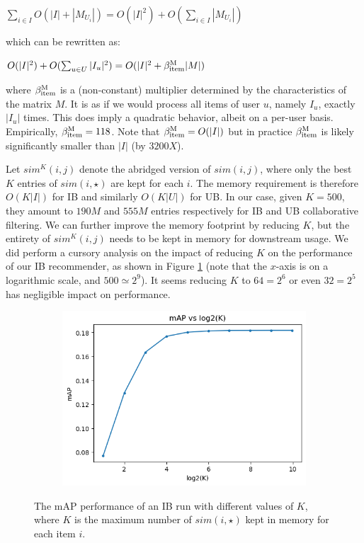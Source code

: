 \documentclass[conference]{IEEEtran}
\newcommand{\mAP}{m\textsc{AP} }
\begin{document}
\hspace{1em}$\sum_{i\in I} O(|I| + |M_{U_i}|) = O(|I|^2) + O(\sum_{i\in I}|M_{U_i}|)$

which can be rewritten as:

\hspace{1em}$O(|I|^2) + O(\sum_{u\in U}|I_u|^2) = O(|I|^2 + \beta_{\rm item}^{\rm M} |M|)$

where $\beta_{\rm item}^{\rm M}$ is a (non-constant) multiplier determined by the characteristics of
the matrix $M$. It is as if
we would process all items of user $u$, namely $I_u$, exactly $|I_u|$ times.
This does imply a quadratic behavior, albeit on a per-user basis.
Empirically, $\beta_{\rm item}^{\rm M} = 118$.
Note that $\beta_{\rm item}^{\rm M} = O(|I|)$ but in practice
$\beta_{\rm item}^{\rm M}$ is likely significantly
smaller than $|I|$ (by $3200X$).

Let $sim^K(i,j)$ denote the abridged version of $sim(i,j)$,
where only the best $K$ entries of $sim(i,\star)$ are kept for each $i$.
The memory requirement is therefore
$O(K|I|)$ for IB and similarly $O(K|U|)$ for UB.
In our case, given $K=500$, they amount to $190M$ and $555M$ entries 
respectively for IB and UB collaborative filtering. We can further improve
the memory footprint by reducing $K$, but the entirety of
$sim^K(i,j)$ needs to be
kept in memory for downstream usage.
We did perform a cursory analysis on the impact of reducing
$K$ on the performance of our IB recommender,
as shown in Figure \ref{fig:log2k} (note that the $x$-axis is on a
logarithmic scale, and $500 \simeq 2^9$). It seems reducing $K$ to
$64 = 2^6$ or even $32 = 2^5$ has negligible impact on performance.

\begin{figure}[htbp]
\centering
\begin{subfigure}{0.85\columnwidth}
  \centering
  \includegraphics[width=\columnwidth]{log2k.png}
\end{subfigure}
\caption{The \mAP performance of an IB run with different values of
$K$, where $K$ is the maximum number of $sim(i,\star)$ kept in
memory for each item $i$.}
\label{fig:log2k}
\end{figure}
\end{document}

